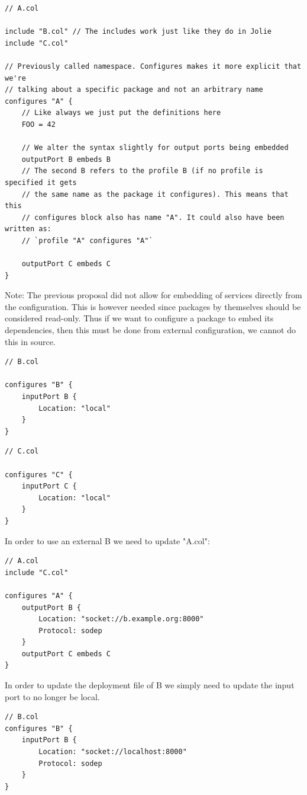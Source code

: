 \begin{verbatim}
// A.col

include "B.col" // The includes work just like they do in Jolie
include "C.col"

// Previously called namespace. Configures makes it more explicit that we're
// talking about a specific package and not an arbitrary name
configures "A" {
    // Like always we just put the definitions here
    FOO = 42

    // We alter the syntax slightly for output ports being embedded
    outputPort B embeds B
    // The second B refers to the profile B (if no profile is specified it gets
    // the same name as the package it configures). This means that this
    // configures block also has name "A". It could also have been written as:
    // `profile "A" configures "A"`

    outputPort C embeds C
}
\end{verbatim}

Note: The previous proposal did not allow for embedding of services directly
from the configuration. This is however needed since packages by themselves
should be considered read-only. Thus if we want to configure a package to embed
its dependencies, then this must be done from external configuration, we cannot
do this in source.

\begin{verbatim}
// B.col

configures "B" {
    inputPort B {
        Location: "local"
    }
}
\end{verbatim}

\begin{verbatim}
// C.col

configures "C" {
    inputPort C {
        Location: "local"
    }
}
\end{verbatim}

In order to use an external B we need to update "A.col":

\begin{verbatim}
// A.col
include "C.col"

configures "A" {
    outputPort B {
        Location: "socket://b.example.org:8000"
        Protocol: sodep
    }
    outputPort C embeds C
}
\end{verbatim}

In order to update the deployment file of B we simply need to update the
input port to no longer be local.

\begin{verbatim}
// B.col
configures "B" {
    inputPort B {
        Location: "socket://localhost:8000"
        Protocol: sodep
    }
}
\end{verbatim}


